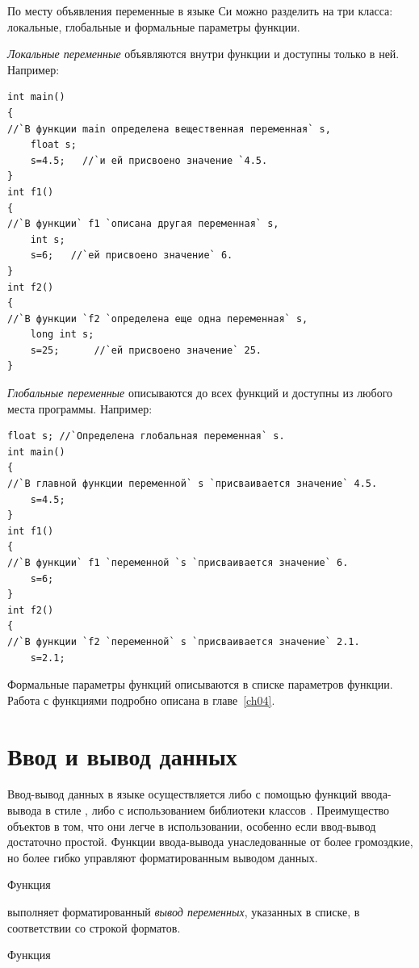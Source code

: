 По месту объявления переменные в языке Си можно разделить на три класса: локальные, глобальные и формальные параметры
функции.

\emph{Локальные переменные} объявляются внутри функции и доступны только в ней.
Например:
\begin{lstlisting}
int main()
{
//`В функции main определена вещественная переменная` s,
    float s; 
    s=4.5;   //`и ей присвоено значение `4.5.
}
int f1()
{
//`В функции` f1 `описана другая переменная` s,
    int s; 
    s=6;   //`ей присвоено значение` 6.
}
int f2()
{
//`В функции `f2 `определена еще одна переменная` s,
	long int s; 
	s=25;      //`ей присвоено значение` 25.
}
\end{lstlisting}

\emph{Глобальные переменные} описываются до всех функций и доступны из любого
места программы. Например:
\begin{lstlisting}
float s; //`Определена глобальная переменная` s.
int main()
{
//`В главной функции переменной` s `присваивается значение` 4.5.
	s=4.5; 
}
int f1()
{
//`В функции` f1 `переменной `s `присваивается значение` 6.
	s=6;
}
int f2()
{
//`В функции `f2 `переменной` s `присваивается значение` 2.1.
    s=2.1;
\end{lstlisting}

Формальные параметры функций описываются в списке параметров функции. Работа с функциями подробно описана в главе~\ref{ch04}.

\section[Ввод и вывод данных]{Ввод и вывод данных}\label{ch02:9}
{Ввод-вывод данных} в языке  осуществляется либо с помощью функций ввода-вывода в стиле , либо с
использованием библиотеки классов . Преимущество объектов  в том, что они легче 
в использовании, особенно если
ввод-вывод достаточно простой. Функции ввода-вывода унаследованные от  более громоздкие, 
но более гибко управляют
форматированным выводом данных.

Функция


выполняет форматированный \emph{вывод переменных}, указанных в списке, в
соответствии со строкой форматов. 

Функция

